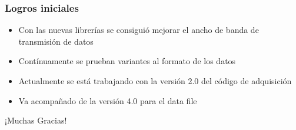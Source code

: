 \documentclass{beamer}
\begin{document}
\begin{frame}
	\frametitle{Logros iniciales}
		\begin{block}{}
    	\begin{itemize}
			\item Con las nuevas librerías se consiguió
						mejorar el ancho de banda de transmisión 
						de datos
			\item Contínuamente se prueban variantes al 
						formato de los datos
			\item Actualmente se está trabajando con la 
						versión 2.0 del código de adquisición
			\item Va acompañado de la versión 4.0 para el 
						data file
    	\end{itemize}
		\end{block}
\end{frame} 

\begin{frame}
  \begin{center}
    \huge{¡Muchas Gracias!}
  \end{center}
\end{frame}
\end{document}
